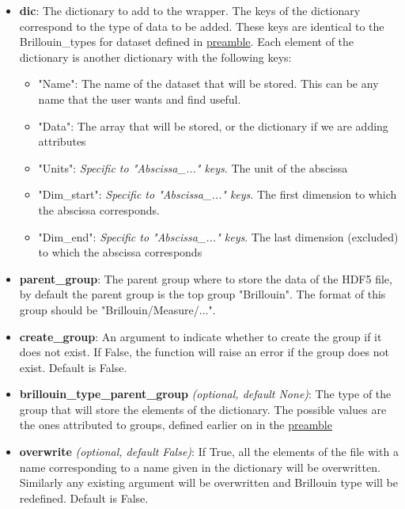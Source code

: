 \begin{itemize}
    \item \textbf{dic}: The dictionary to add to the wrapper. The keys of the dictionary correspond to the type of data to be added. These keys are identical to the Brillouin\_types for dataset defined in \hyperref[subsec:preamble.file_structure.complete_structure]{preamble}. Each element of the dictionary is another dictionary with the following keys:
    \begin{itemize}
        \item "Name": The name of the dataset that will be stored. This can be any name that the user wants and find useful.
        \item "Data": The array that will be stored, or the dictionary if we are adding attributes
        \item "Units": \textit{Specific to "Abscissa\_..." keys}. The unit of the abscissa
        \item "Dim\_start": \textit{Specific to "Abscissa\_..." keys}. The first dimension to which the abscissa corresponds.
        \item "Dim\_end": \textit{Specific to "Abscissa\_..." keys}. The last dimension (excluded) to which the abscissa corresponds
    \end{itemize}
    \item \textbf{parent\_group}: The parent group where to store the data of the HDF5 file, by default the parent group is the top group "Brillouin". The format of this group should be "Brillouin/Measure/...". 
    \item \textbf{create\_group}: An argument to indicate whether to create the group if it does not exist. If False, the function will raise an error if the group does not exist. Default is False.
    \item \textbf{brillouin\_type\_parent\_group} \textit{(optional, default None)}: The type of the group that will store the elements of the dictionary. The possible values are the ones attributed to groups, defined earlier on in the \hyperref[subsec:preamble.file_structure.complete_structure]{preamble}
    \item \textbf{overwrite} \textit{(optional, default False)}: If True, all the elements of the file with a name corresponding to a name given in the dictionary will be overwritten. Similarly any existing argument will be overwritten and Brillouin type will be redefined. Default is False.
\end{itemize}

